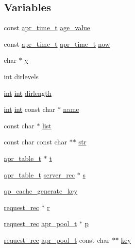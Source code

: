 \subsection*{Variables}
\begin{DoxyCompactItemize}
\item 
const \hyperlink{group__apr__time_gadb4bde16055748190eae190c55aa02bb}{apr\+\_\+time\+\_\+t} \hyperlink{group__MOD__CACHE_ga8732241849982352d73c94dcda0b81ed}{age\+\_\+value}
\item 
const \hyperlink{group__apr__time_gadb4bde16055748190eae190c55aa02bb}{apr\+\_\+time\+\_\+t} \hyperlink{group__apr__time_gadb4bde16055748190eae190c55aa02bb}{apr\+\_\+time\+\_\+t} \hyperlink{group__MOD__CACHE_ga33504014e188d5d7506173cc14fb5801}{now}
\item 
char $\ast$ \hyperlink{group__MOD__CACHE_gad4d47f76a849e2c428e3dd7f8c4eab1f}{y}
\item 
\hyperlink{pcre_8txt_a42dfa4ff673c82d8efe7144098fbc198}{int} \hyperlink{group__MOD__CACHE_gaf207be4a97a5ab15bbacf5df43aa839a}{dirlevels}
\item 
\hyperlink{pcre_8txt_a42dfa4ff673c82d8efe7144098fbc198}{int} \hyperlink{pcre_8txt_a42dfa4ff673c82d8efe7144098fbc198}{int} \hyperlink{group__MOD__CACHE_gabfa727ac764c820d796f407b02cd22a1}{dirlength}
\item 
\hyperlink{pcre_8txt_a42dfa4ff673c82d8efe7144098fbc198}{int} \hyperlink{pcre_8txt_a42dfa4ff673c82d8efe7144098fbc198}{int} const char $\ast$ \hyperlink{group__MOD__CACHE_gaa2898f544f5179902abf4aac7df35314}{name}
\item 
const char $\ast$ \hyperlink{group__MOD__CACHE_gac577f43b171a35e92134066e4044b860}{list}
\item 
const char const char $\ast$$\ast$ \hyperlink{group__MOD__CACHE_gaee54659c51458a64c831e6bd53d1235b}{str}
\item 
\hyperlink{structapr__table__t}{apr\+\_\+table\+\_\+t} $\ast$ \hyperlink{group__MOD__CACHE_gad350742715474fb8bcf9a1e2917498b1}{t}
\item 
\hyperlink{structapr__table__t}{apr\+\_\+table\+\_\+t} \hyperlink{structserver__rec}{server\+\_\+rec} $\ast$ \hyperlink{group__MOD__CACHE_gaeaf508d77914ef408aae1783d6016f08}{s}
\item 
\hyperlink{group__MOD__CACHE_ga5d2f230364a78ad03f94ebbca2dd1f5c}{ap\+\_\+cache\+\_\+generate\+\_\+key}
\item 
\hyperlink{structrequest__rec}{request\+\_\+rec} $\ast$ \hyperlink{group__MOD__CACHE_gac68e921ed15f71060d618adb662a84f6}{r}
\item 
\hyperlink{structrequest__rec}{request\+\_\+rec} \hyperlink{structapr__pool__t}{apr\+\_\+pool\+\_\+t} $\ast$ \hyperlink{group__MOD__CACHE_ga500bb2716e136608a89fae583ed460cb}{p}
\item 
\hyperlink{structrequest__rec}{request\+\_\+rec} \hyperlink{structapr__pool__t}{apr\+\_\+pool\+\_\+t} const char $\ast$$\ast$ \hyperlink{group__MOD__CACHE_ga11d8023381192746eb96be162398fe1c}{key}
\end{DoxyCompactItemize}


